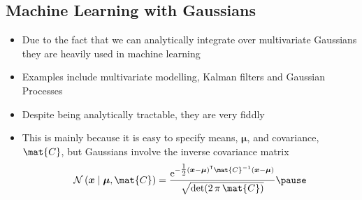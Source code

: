 \begin{slide}
\section[-1]{Machine Learning with Gaussians}

\begin{PauseHighLight}
  \begin{itemize}
  \item Due to the fact that we can analytically integrate over
    multivariate Gaussians they are heavily used in machine
    learning\pause
  \item Examples include multivariate modelling, Kalman filters and
    Gaussian Processes\pause
  \item Despite being analytically tractable, they are very fiddly\pause
  \item This is mainly because it is easy to specify means,
    $\bm{\mu}$, and covariance, $\mat{C}$, but Gaussians involve the
    inverse covariance matrix
    \begin{align*}
      \mathcal{N}\left(\bm{x} \mid \bm{\mu}, \mat{C}\right) =
      \frac{\e{-\tfrac{1}{2} (\bm{x} - \bm{\mu})^\tr \mat{C}^{-1}
      (\bm{x}-\bm{\mu})}}{\sqrt{\det(2\,\pi\,\mat{C})}}\pause
    \end{align*}
  \end{itemize}
\end{PauseHighLight}

\end{slide}


